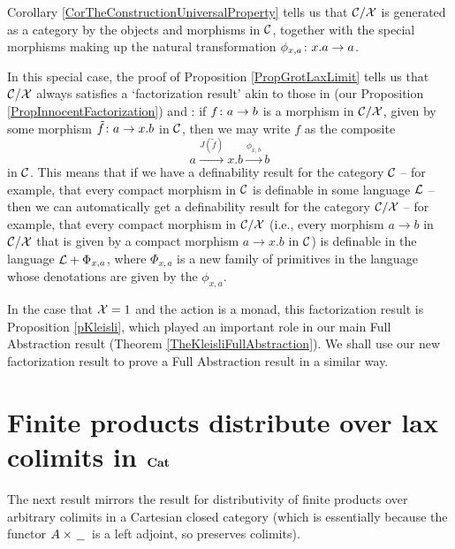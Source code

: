 Corollary \ref{CorTheConstructionUniversalProperty} tells us that ${\mathcal{C}}/\mathcal X$ is generated as a category by the objects and morphisms in ${\mathcal{C}}$, together with the special morphisms making up the natural transformation $\phi_{x,a}\colon x.a \to a$.  

In this special case, the proof of Proposition \ref{PropGrotLaxLimit} tells us that ${\mathcal{C}}/\mathcal X$ always satisfies a `factorization result' akin to those in \cite{SamsonGuyIAActive} (our Proposition \ref{PropInnocentFactorization}) and \cite{mcCHFiniteND}: if $f \colon a \to b$ is a morphism in ${\mathcal{C}}/\mathcal X$, given by some morphism $\tilde{f}\colon a \to x.b$ in ${\mathcal{C}}$, then we may write $f$ as the composite
\[
  a \xrightarrow{J(\tilde{f})} x.b \xrightarrow{\phi_{x,b}} b
  \]
in ${\mathcal{C}}$.  
This means that if we have a definability result for the category ${\mathcal{C}}$ -- for example, that every compact morphism in ${\mathcal{C}}$ is definable in some language $\mathcal L$ -- then we can automatically get a definability result for the category ${\mathcal{C}}/\mathcal X$ -- for example, that every compact morphism in ${\mathcal{C}}/\mathcal X$ (i.e., every morphism $a\to b$ in ${\mathcal{C}}/\mathcal X$ that is given by a compact morphism $a \to x.b$ in ${\mathcal{C}}$) is definable in the language $\mathcal L + \Phi_{x,a}$, where $\Phi_{x,a}$ is a new family of primitives in the language whose denotations are given by the $\phi_{x,a}$.

In the case that $\mathcal X=1$ and the action is a monad, this factorization result is Proposition \ref{pKleisli}, which played an important role in our main Full Abstraction result (Theorem \ref{TheKleisliFullAbstraction}).
We shall use our new factorization result to prove a Full Abstraction result in a similar way.

\section{Finite products distribute over lax colimits in ${\normalfont\textbf{Cat}}$}

The next result mirrors the result for distributivity of finite products over arbitrary colimits in a Cartesian closed category (which is essentially because the functor $A \times \,\underline{\hspace{1.5ex}}\,$ is a left adjoint, so preserves colimits).

